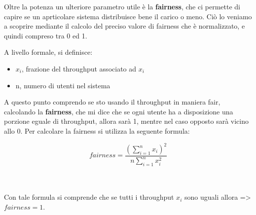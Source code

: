 Oltre la potenza un ulteriore parametro utile è la \textbf{fairness}, che ci permette di capire se un aprticolare sistema distribuisce bene il carico o meno. Ciò lo veniamo a scoprire mediante il calcolo del preciso valore di fairness che è normalizzato, e quindi compreso tra 0 ed 1.

A livello formale, si definisce:

\begin{itemize}
    \item \(x_i\), frazione del throughput associato ad \(x_i\)
    \item n, numero di utenti nel sistema
\end{itemize}

A questo punto comprendo se sto usando il throughput in maniera fair, calcolando la \textbf{fairness}, che mi dice che se ogni utente ha a disposizione una porzione eguale di throughput, allora sarà 1, mentre nel caso opposto sarà vicino allo 0.
Per calcolare la fairness si utilizza la seguente formula:

\Large
\[
fairness = \frac{\left(\sum_{i=1}^{n}x_i\right)^2}{n\sum_{i=1}^{n}x_i^2}
\]
\\\\
\normalsize

Con tale formula si comprende che se tutti i throughput \(x_i\) sono uguali allora => \(fairness = 1\).


